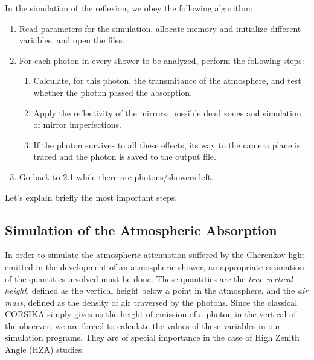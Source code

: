 \simprocessfig
%
In the simulation of the reflexion, we obey the following algorithm:
%
\begin{enumerate}[1.]

\item Read parameters for the simulation, allocate memory and
  initialize different variables, and open the files.

\item For each \Cherenkov photon in every shower to be analyzed,
  perform the following steps:
  
  \begin{enumerate}[\theenumi.1.]
  \item Calculate, for this photon, the transmitance of the
    atmosphere, and test whether the photon passed the absorption.
    
  \item Apply the reflectivity of the mirrors, possible dead zones and
    simulation of mirror imperfections.

  \item If the photon survives to all these effects, its way to the
    camera plane is traced and the photon is saved to the output file.
  \end{enumerate}

\item Go back to 2.1 while there are photons/showers left.

\end{enumerate}

Let's explain briefly the most important steps.

\subsection{Simulation of the Atmospheric Absorption}

In order to simulate the atmospheric attenuation suffered by the
Cherenkov light emitted in the development of an atmospheric shower,
an appropriate estimation of the quantities involved must be done.
These quantities are the \emph{true vertical height}, defined as the
vertical height below a point in the atmosphere, and the \emph{air
  mass}, defined as the density of air traversed by the photons. Since
the classical CORSIKA simply gives us the height of emission of a
photon in the vertical of the observer, we are forced to calculate the
values of these variables in our simulation programs. They are of
special importance in the case of High Zenith Angle (HZA) studies.

